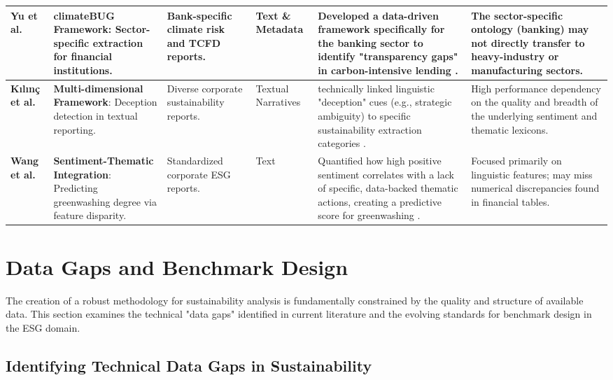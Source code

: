 \documentclass[english, online, cse, master]{dithesis}
\begin{document}
\begin{landscape}
\begin{table}[p]
\begin{tabularx}{\linewidth}{|p{1.8cm}|p{3.5cm}|p{2.5cm}|p{1.8cm}|X|X|}
\textbf{Yu et al.}  \parencite{yinan_yu_e282fd98} & \textbf{climateBUG Framework}: Sector-specific extraction for financial institutions. & Bank-specific climate risk and TCFD reports. & Text \& Metadata & Developed a data-driven framework specifically for the banking sector to identify "transparency gaps" in carbon-intensive lending  \parencite{yinan_yu_e282fd98}. & The sector-specific ontology (banking) may not directly transfer to heavy-industry or manufacturing sectors. \\ \hline
\textbf{Kılınç et al.}  \parencite{yavuz_k_l_n__64e32f80} & \textbf{Multi-dimensional Framework}: Deception detection in textual reporting. & Diverse corporate sustainability reports. & Textual Narratives & technically linked linguistic "deception" cues (e.g., strategic ambiguity) to specific sustainability extraction categories  \parencite{yavuz_k_l_n__64e32f80}. & High performance dependency on the quality and breadth of the underlying sentiment and thematic lexicons. \\ \hline
\textbf{Wang et al.}  \parencite{xiaojia_wang_02351a60} & \textbf{Sentiment-Thematic Integration}: Predicting greenwashing degree via feature disparity. & Standardized corporate ESG reports. & Text & Quantified how high positive sentiment correlates with a lack of specific, data-backed thematic actions, creating a predictive score for greenwashing  \parencite{xiaojia_wang_02351a60}. & Focused primarily on linguistic features; may miss numerical discrepancies found in financial tables. \\ \hline
\end{tabularx}
\end{table}
\end{landscape}

\section{ Data Gaps and Benchmark Design}

The creation of a robust methodology for sustainability analysis is fundamentally constrained by the quality and structure of available data. This section examines the technical "data gaps" identified in current literature and the evolving standards for benchmark design in the ESG domain.
\subsection{Identifying Technical Data Gaps in Sustainability}
\end{document}
